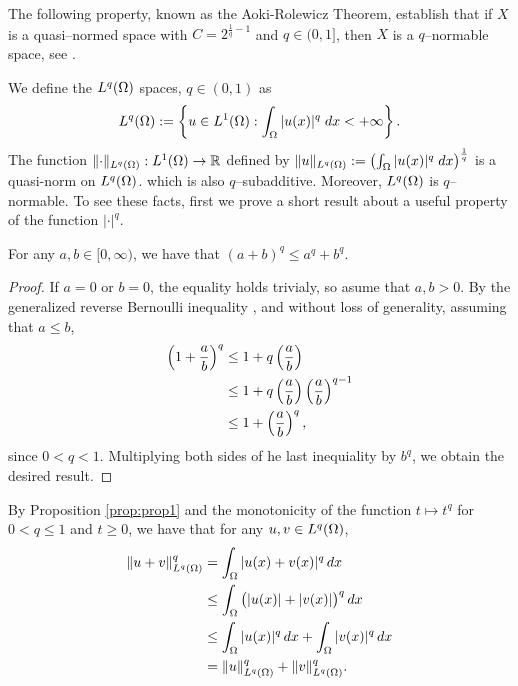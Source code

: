 		The following property, known as the Aoki-Rolewicz Theorem, establish that  if 
		$X$ is a quasi--normed space with $C=2^{\frac{1}{q}-1}$ and $q\in (0,1]$, then $X$ is a 
		$q$--normable space, see \cite[Chapter 25]{geometry_banach_spaces}.

		We define the $L^q(\Omega)$ spaces, $q\in (0,1)$ as
		\[
		L^q(\Omega):=\left\{u\in L^1(\Omega): \int_{\Omega} |u(x)|^q \; dx<+\infty\right\}.
		\]
		The function $\lVert \cdot \rVert_{L^q(\Omega)}:L^1(\Omega)\to \mathbb{R}$ defined by 
		$\lVert u \rVert_{L^q(\Omega)}:=\left(\int_{\Omega} |u(x)|^q \; dx\right)^{\frac{1}{q}}$ is a quasi-norm on $L^q(\Omega)$.
		which is also $q$--subadditive. Moreover, $L^q(\Omega)$ is $q$--normable. To see these facts,
		first we prove a short result about a useful property of the function $|\cdot|^q$.
		\begin{proposition}\label{prop:prop1}
			For any $a,b\in [0,\infty)$, we have that $(a+b)^q\le a^q+b^q$.
		\end{proposition}
		\begin{proof}
			If $a=0$ or $b=0$, the equality holds trivialy, so asume that $a,b>0$.
			By the generalized reverse Bernoulli inequality \cite[Lemma 2.4]{li_yeh_bernoulli_2013}, 
			and without loss of generality, assuming that $a\le b$,
			\begin{align*}
				\left(1+\frac{a}{b}\right)^q&\le 1+q\left(\frac{a}{b}\right)\\
				&\le 1+q\left(\frac{a}{b}\right)\left(\frac{a}{b}\right)^{q-1}\\
				&\le 1+\left(\frac{a}{b}\right)^{q},
			\end{align*}
			since $0<q<1$. Multiplying both sides of he last inequiality by $b^q$, 
			we obtain the desired result.
		\end{proof}

		By Proposition \ref{prop:prop1} and the monotonicity of the function $t\mapsto t^q$ for 
$0<q\le1$ and $t\ge 0$, we have that for any $u,v\in L^{q}(\Omega)$,
\begin{equation}\label{eq:q_subadditivity}
\begin{aligned}
\lVert u+v \rVert_{L^q(\Omega)}^q
&= \int_{\Omega}|u(x)+v(x)|^q\, dx \\
&\le \int_{\Omega}\big(|u(x)| + |v(x)|\big)^{q}\, dx \\
&\le \int_{\Omega}|u(x)|^q\, dx
+ \int_{\Omega}|v(x)|^q\, dx \\
&= \lVert u \rVert_{L^q(\Omega)}^q
+ \lVert v \rVert_{L^q(\Omega)}^q .
\end{aligned}
\end{equation}

